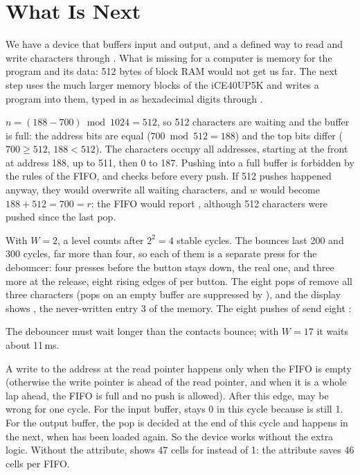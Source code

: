 \section{What Is Next}

We have a device that buffers input and output, and a defined way to read and
write characters through . What is missing for a computer is memory
for the program and its data: 512 bytes of block RAM would not get us far. The
next step uses the much larger memory blocks of the iCE40UP5K and writes a
program into them, typed in as hexadecimal digits through .

\solutions

\solution
$n = (188 - 700) \bmod 1024 = 512$, so 512 characters are waiting and the
buffer is full: the address bits are equal ($700 \bmod 512 = 188$) and the
top bits differ ($700 \ge 512$, $188 < 512$). The characters occupy all
addresses, starting at the front at address 188, up to 511, then 0 to 187.
Pushing into a full buffer is forbidden by the rules of the FIFO, and
 checks  before every push. If 512 pushes happened anyway,
they would overwrite all waiting characters, and $w$ would become
$188 + 512 = 700 = r$: the FIFO would report , although 512
characters were pushed since the last pop.

\solution
With $W = 2$, a level counts after $2^2 = 4$ stable cycles. The bounces last
200 and 300 cycles, far more than four, so each of them is a separate press
for the debouncer: four presses before the button stays down, the real one,
and three more at the release, eight rising edges of  per button.
The eight pops of  remove all three characters (pops on an empty
buffer are suppressed by ), and the display shows , the
never-written entry 3 of the memory. The eight pushes of  send eight
:


The debouncer must wait longer than the contacts bounce; with $W = 17$ it
waits about 11\,ms.

\solution
A write to the address at the read pointer happens only when the FIFO is empty
(otherwise the write pointer is ahead of the read pointer, and when it is a
whole lap ahead, the FIFO is full and no push is allowed). After this edge,
 may be wrong for one cycle. For the input buffer, 
stays 0 in this cycle because  is still 1. For the output
buffer, the pop is decided at the end of this cycle and happens in the next,
when  has been loaded again. So the device works without the
extra logic. Without the attribute,  shows 47 cells for
 instead of 1: the attribute saves 46 cells per FIFO.

